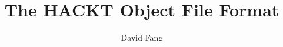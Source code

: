 \documentclass[12pt]{book}
\newif\ifpdf
\begin{document}
\title{The HACKT Object File Format}
\author{David Fang}

\ifpdf\pdfbookmark[0]{Title Page}{title}\fi
\maketitle

\ifpdf\pdfbookmark[0]{Table of Contents}{toc}\fi
\tableofcontents










\appendix



% 

\clearpage
\ifpdf\pdfbookmark[0]{Index}{index}\fi
\printindex
\end{document}
